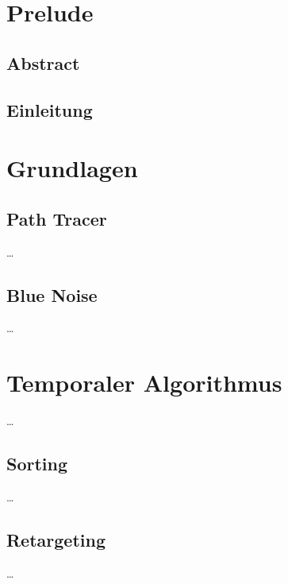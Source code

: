 
\chapter{Prelude}
\label{ch:Introduction}

\section{Abstract}

\section{Einleitung}


\chapter{Grundlagen}
\label{ch:Grundlagen}


\section{Path Tracer}
\label{ch:Content1:sec:Path Tracer}


\dots


\section{Blue Noise}
\label{ch:Content1:sec:BlueNoise}


\dots



\chapter{Temporaler Algorithmus}
\label{ch:Content2}

\dots


\section{Sorting}
\label{ch:Content2:sec:Sorting}


\dots


\section{Retargeting}
\label{ch:Content2:sec:Retargeting}


\dots
